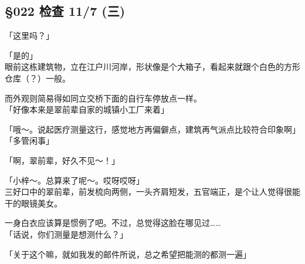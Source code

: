 \subsection{§022 检查 11/7 (三)}

「这里吗？」

「是的」\\

眼前这栋建筑物，立在江户川河岸，形状像是个大箱子，看起来就跟个白色的方形仓库（？）一般。

而外观则简易得如同立交桥下面的自行车停放点一样。\\

「好像本来是翠前辈自家的城镇小工厂来着」

「哦～。说起医疗测量这行，感觉地方再偏僻点，建筑再气派点比较符合印象啊」\\

「多管闲事」

「啊，翠前辈，好久不见～！」

「小梓～。总算来了呢～。哎呀哎呀」\\

三好口中的翠前辈，前发梳向两侧，一头齐肩短发，五官端正，是个让人觉得很能干的眼镜美女。

一身白衣应该算是惯例了吧。不过，总觉得这脸在哪见过……\\

「话说，你们测量是想测什么？」

「关于这个嘛，就如我发的邮件所说，总之希望把能测的都测一遍」

